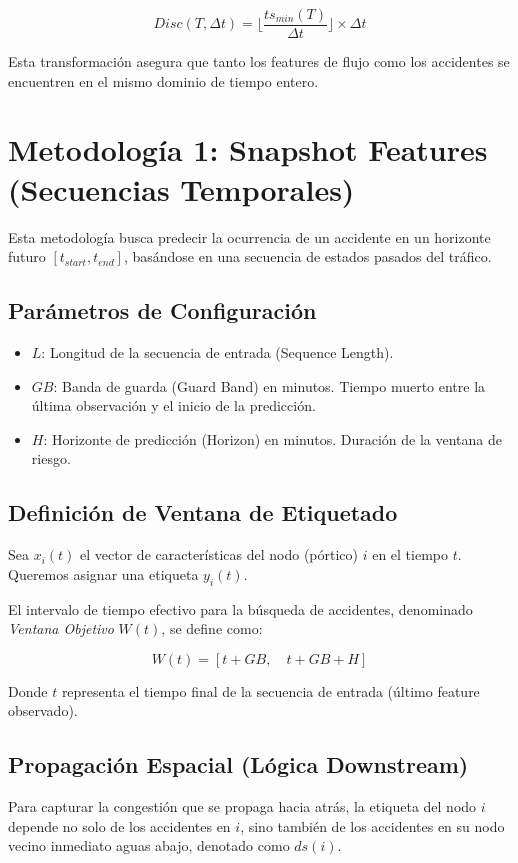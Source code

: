 \documentclass[11pt, letterpaper]{article}
\begin{document}
\begin{equation}
    Disc(T, \Delta t) = \lfloor \frac{ts_{min}(T)}{\Delta t} \rfloor \times \Delta t
\end{equation}

Esta transformación asegura que tanto los features de flujo como los accidentes se encuentren en el mismo dominio de tiempo entero.

\section{Metodología 1: Snapshot Features (Secuencias Temporales)}

Esta metodología busca predecir la ocurrencia de un accidente en un horizonte futuro $[t_{start}, t_{end}]$, basándose en una secuencia de estados pasados del tráfico.

\subsection{Parámetros de Configuración}
\begin{itemize}
    \item $L$: Longitud de la secuencia de entrada (Sequence Length).
    \item $GB$: Banda de guarda (Guard Band) en minutos. Tiempo muerto entre la última observación y el inicio de la predicción.
    \item $H$: Horizonte de predicción (Horizon) en minutos. Duración de la ventana de riesgo.
\end{itemize}

\subsection{Definición de Ventana de Etiquetado}
Sea $x_i(t)$ el vector de características del nodo (pórtico) $i$ en el tiempo $t$. Queremos asignar una etiqueta $y_i(t)$.

El intervalo de tiempo efectivo para la búsqueda de accidentes, denominado \textit{Ventana Objetivo} $W(t)$, se define como:

\begin{equation}
    W(t) = [t + GB, \quad t + GB + H]
\end{equation}

Donde $t$ representa el tiempo final de la secuencia de entrada (último feature observado).

\subsection{Propagación Espacial (Lógica Downstream)}
Para capturar la congestión que se propaga hacia atrás, la etiqueta del nodo $i$ depende no solo de los accidentes en $i$, sino también de los accidentes en su nodo vecino inmediato aguas abajo, denotado como $ds(i)$.
\end{document}
